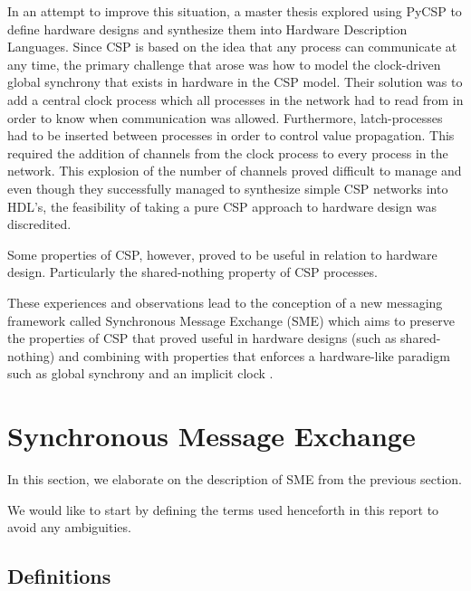 In an attempt to improve this situation, a master thesis explored
using PyCSP to define hardware designs and synthesize them into
Hardware Description Languages. Since CSP is based on the idea that
any process can communicate at any time, the primary challenge that
arose was how to model the clock-driven global synchrony that exists
in hardware in the CSP model. Their solution was to add a central
clock process which all processes in the network had to read from in
order to know when communication was allowed. Furthermore,
latch-processes had to be inserted between processes in order to
control value propagation. This required the addition of channels from
the clock process to every process in the network. This explosion of
the number of channels proved difficult to manage and even though they
successfully managed to synthesize simple CSP networks into HDL's, the
feasibility of taking a pure CSP approach to hardware design was
discredited.

Some properties of CSP, however, proved to be useful in relation to
hardware design. Particularly the shared-nothing property of CSP
processes.

These experiences and observations lead to the conception of a new
messaging framework called Synchronous Message Exchange (SME) which
aims to preserve the properties of CSP that proved useful in hardware
designs (such as shared-nothing) and combining with properties that
enforces a hardware-like paradigm such as global synchrony and an
implicit clock \cite{vinter2014synchronous}.



\section{Synchronous Message Exchange}
In this section, we elaborate on the description of SME from the
previous section.

We would like to start by defining the terms used henceforth in this
report to avoid any ambiguities.



\subsection{Definitions}

